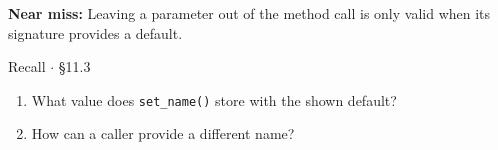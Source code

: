 \documentclass[11pt]{article}
\begin{document}
\begin{keepsection}
\begin{notebox}\textbf{Near miss:} Leaving a parameter out of the method call is only valid when its signature provides a default.\end{notebox}

\begin{recallbox}{Recall \ensuremath{\cdot} §11.3}
\begin{enumerate}
\item What value does \texttt{set\_name()} store with the shown default?
\item How can a caller provide a different name?
\end{enumerate}

\end{recallbox}
\end{keepsection}
\end{document}
